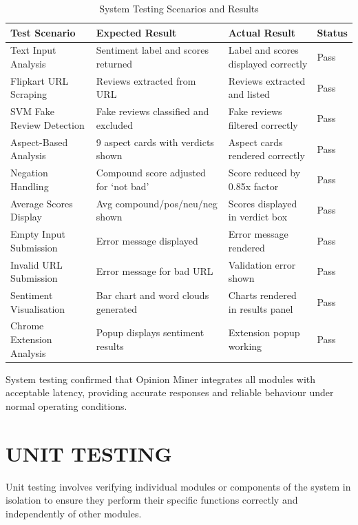 \documentclass[12pt,a4paper]{report}
\begin{document}
\begin{table}[H]
\centering
\begin{tabular}{|p{3.5cm}|p{4cm}|p{4cm}|p{1.8cm}|}
\hline
\textbf{Test Scenario} & \textbf{Expected Result} & \textbf{Actual Result} & \textbf{Status} \\
\hline
Text Input Analysis & Sentiment label and scores returned & Label and scores displayed correctly & Pass \\
\hline
Flipkart URL Scraping & Reviews extracted from URL & Reviews extracted and listed & Pass \\
\hline
SVM Fake Review Detection & Fake reviews classified and excluded & Fake reviews filtered correctly & Pass \\
\hline
Aspect-Based Analysis & 9 aspect cards with verdicts shown & Aspect cards rendered correctly & Pass \\
\hline
Negation Handling & Compound score adjusted for `not bad' & Score reduced by 0.85x factor & Pass \\
\hline
Average Scores Display & Avg compound/pos/neu/neg shown & Scores displayed in verdict box & Pass \\
\hline
Empty Input Submission & Error message displayed & Error message rendered & Pass \\
\hline
Invalid URL Submission & Error message for bad URL & Validation error shown & Pass \\
\hline
Sentiment Visualisation & Bar chart and word clouds generated & Charts rendered in results panel & Pass \\
\hline
Chrome Extension Analysis & Popup displays sentiment results & Extension popup working & Pass \\
\hline
\end{tabular}
\caption{System Testing Scenarios and Results}
\end{table}

System testing confirmed that Opinion Miner integrates all modules with acceptable latency, providing accurate responses and reliable behaviour under normal operating conditions.

\section{UNIT TESTING}

Unit testing involves verifying individual modules or components of the system in isolation to ensure they perform their specific functions correctly and independently of other modules.
\end{document}
